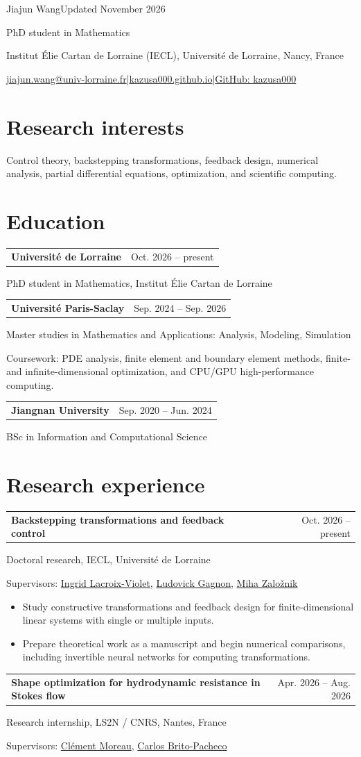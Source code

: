 \documentclass[10pt,a4paper]{article}
\makeatletter
\newcommand{\entry}[3]{\par\begin{tabularx}{\textwidth}{@{}Xr@{}}\textbf{#1}&{\small\color{muted}#2}\end{tabularx}\par{\small\color{muted}#3}\par}
\makeatother
\begin{document}
{\Huge Jiajun Wang}\hfill{\small\color{muted}Updated November 2026}\par
{\large PhD student in Mathematics}\par
Institut \'Elie Cartan de Lorraine (IECL), Universit\'e de Lorraine, Nancy, France\par
\href{mailto:jiajun.wang@univ-lorraine.fr}{jiajun.wang@univ-lorraine.fr}\enspace|\enspace\href{https://kazusa000.github.io}{kazusa000.github.io}\enspace|\enspace\href{https://github.com/kazusa000}{GitHub: kazusa000}

\section{Research interests}
Control theory, backstepping transformations, feedback design, numerical analysis, partial differential equations, optimization, and scientific computing.

\section{Education}
\entry{Universit\'e de Lorraine}{Oct. 2026 -- present}{PhD student in Mathematics, Institut \'Elie Cartan de Lorraine}
\entry{Universit\'e Paris-Saclay}{Sep. 2024 -- Sep. 2026}{Master studies in Mathematics and Applications: Analysis, Modeling, Simulation}
Coursework: PDE analysis, finite element and boundary element methods, finite- and infinite-dimensional optimization, and CPU/GPU high-performance computing.
\entry{Jiangnan University}{Sep. 2020 -- Jun. 2024}{BSc in Information and Computational Science}

\section{Research experience}
\entry{Backstepping transformations and feedback control}{Oct. 2026 -- present}{Doctoral research, IECL, Universit\'e de Lorraine}
{\small\color{muted}Supervisors: \href{https://iecl.univ-lorraine.fr/membre-iecl/lacroix-violet-ingrid/}{Ingrid Lacroix-Violet}, \href{https://iecl.univ-lorraine.fr/une-action-exploratoire-pour-defricher-une-nouvelle-branche-des-mathematiques/}{Ludovick Gagnon}, \href{https://orcid.org/0000-0001-9810-2360}{Miha Zalo\v{z}nik}}\par

\begin{itemize}
\item Study constructive transformations and feedback design for finite-dimensional linear systems with single or multiple inputs.
\item Prepare theoretical work as a manuscript and begin numerical comparisons, including invertible neural networks for computing transformations.
\end{itemize}
\entry{Shape optimization for hydrodynamic resistance in Stokes flow}{Apr. 2026 -- Aug. 2026}{Research internship, LS2N / CNRS, Nantes, France}
{\small\color{muted}Supervisors: \href{https://clementmoreau.github.io/}{Cl\'ement Moreau}, \href{https://cbritopacheco.github.io/}{Carlos Brito-Pacheco}}\par
\end{document}
